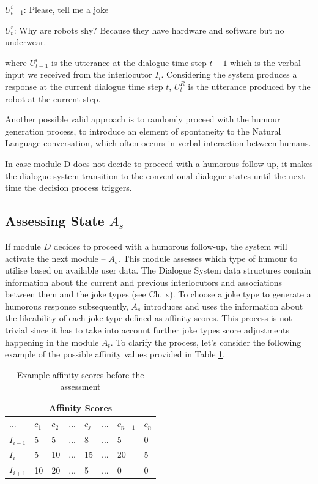 \( U_{t-1}^{i}\): Please, tell me a joke

\( U_t^r\): Why are robots shy? Because they have hardware and software but no underwear.
    
where \( U_{t-1}^{i}\) is the utterance at the dialogue time step \( t-1\) which is the verbal input we received from the interlocutor \( I_i\). Considering the system produces a response at the current dialogue time step \( t\), \( U_{t}^{R}\) is the utterance produced by the robot at the current step. \par

Another possible valid approach is to randomly proceed with the humour generation process, to introduce an element of spontaneity to the Natural Language conversation, which often occurs in verbal interaction between humans. \par

In case module D does not decide to proceed with a humorous follow-up, it makes the dialogue system transition to the conventional dialogue states until the next time the decision process triggers. \par

\subsection{Assessing State \texorpdfstring{\( A_s\)}{As}}\label{subs:As}

If module \( D\) decides to proceed with a humorous follow-up, the system will activate the next module – \( A_s\). This module assesses which type of humour to utilise based on available user data. The Dialogue System data structures contain information about the current and previous interlocutors and associations between them and the joke types (see Ch. x). To choose a joke type to generate a humorous response subsequently, \( A_s\) introduces and uses the information about the likeability of each joke type defined as affinity scores. This process is not trivial since it has to take into account further joke types score adjustments happening in the module \( A_t\). To clarify the process, let’s consider the following example of the possible affinity values provided in Table \ref{table:1}. \par
    
\begin{table}[htpb]
\centering
\begin{tabular}{ |l|l l l l l l l|  }
    \hline
    \multicolumn{8}{|c|}{Affinity Scores} \\
    \hline
    ... & \( c_1\) & \( c_2\) & ... & \( c_j\) & ... & \( c_{n-1}\) & \( c_n\) \\
    \hline
    \( I_{i-1}\) & 5 & 5 & ... & 8 & ... & 5 & 0 \\
    \( I_{i}\) & 5 & 10 & ... & 15 & ... & 20 & 5 \\
    \( I_{i+1}\) & 10 & 20 & ... & 5 & ... & 0 & 0 \\
    \hline
    \end{tabular}
\caption{Example affinity scores before the assessment}
\label{table:1}
\end{table}
    
